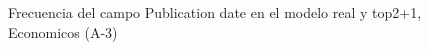\begin{figure}[H]
    \centering
    
    \caption{Frecuencia del campo Publication date en el modelo real y top2+1, Economicos (A-3)}
    \label{frecuency-Publication Date-top2+1}
\end{figure}